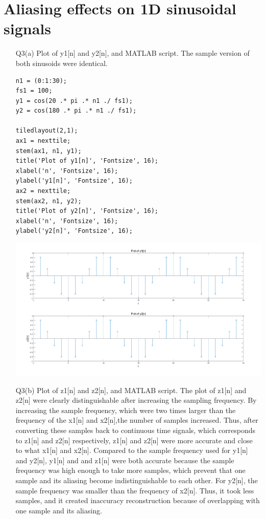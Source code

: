 \documentclass{article}
\begin{document}
\section{Aliasing effects on 1D sinusoidal signals}

\begin{enumerate}
\item[Q3(a)] Plot of y1[n] and y2[n], and MATLAB script. The sample version of 
both sinusoids were identical.

\begin{lstlisting}
n1 = (0:1:30);
fs1 = 100;
y1 = cos(20 .* pi .* n1 ./ fs1);
y2 = cos(180 .* pi .* n1 ./ fs1);
    
tiledlayout(2,1);
ax1 = nexttile;
stem(ax1, n1, y1);
title('Plot of y1[n]', 'Fontsize', 16);
xlabel('n', 'Fontsize', 16);
ylabel('y1[n]', 'Fontsize', 16);
ax2 = nexttile;
stem(ax2, n1, y2);
title('Plot of y2[n]', 'Fontsize', 16);
xlabel('n', 'Fontsize', 16);
ylabel('y2[n]', 'Fontsize', 16);
\end{lstlisting}

\includegraphics[width=\textwidth]{Question3A.png}

\item[Q3(b)] Plot of z1[n] and z2[n], and MATLAB script. The plot of z1[n] and 
z2[n] were clearly distinguishable after increasing the sampling frequency. By 
increasing the sample frequency, which were two times larger than the frequency 
of the x1[n] and x2[n],the number of samples increased. Thus, after converting 
these samples back to continuous time signals, which corresponds to z1[n] and 
z2[n] respectively, z1[n] and z2[n] were more accurate and close to what x1[n] 
and x2[n]. Compared to the sample frequency used for y1[n] and y2[n], y1[n] and 
and z1[n] were both accurate because the sample frequency was high enough to take 
more samples, which prevent that one sample and its aliasing become indistinguishable
to each other. For y2[n], the sample frequency was smaller than the frequency of x2[n].
Thus, it took less samples, and it created inaccuracy reconstruction because of 
overlapping with one sample and its aliasing. 


\end{enumerate}
\end{document}
